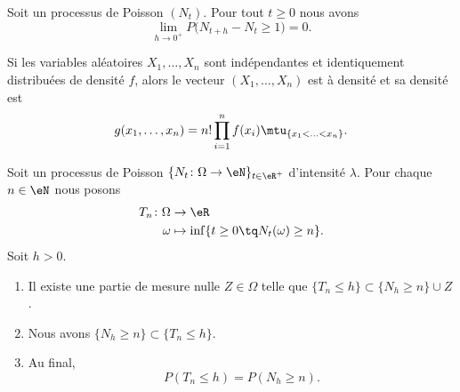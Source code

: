 \begin{proposition}   \label{PROPooGMBBooCIkVCB}
	Soit un processus de Poisson \( (N_t)\). Pour tout \( t\geq 0\) nous avons
	\begin{equation}
		\lim_{h\to 0^+} P\big( N_{t+h}-N_t\geq 1 \big)=0.
	\end{equation}
\end{proposition}

\begin{lemma}     \label{LEMooLNIZooDWUvRN}
	Si les variables aléatoires \( X_1,\ldots, X_n\) sont indépendantes et identiquement distribuées de densité \( f\), alors le vecteur \( (X_1,\ldots, X_n)\) est à densité et sa densité est
	\begin{equation}
		g(x_1,\ldots, x_n)=n!\prod_{i=1}^nf(x_i)\mtu_{\{ x_1<\ldots<x_n \}}.
	\end{equation}
\end{lemma}

\begin{lemma}        \label{LEMooXTVNooSBnnAd}
	Soit un processus de Poisson \(  \{ N_t\colon \Omega\to \eN \}_{t\in \eR^+}  \) d'intensité \( \lambda\). Pour chaque \( n\in \eN\) nous posons
	\begin{equation}
		\begin{aligned}
			T_n\colon \Omega & \to \eR                                         \\
			\omega           & \mapsto \inf\{ t\geq 0\tq N_t(\omega)\geq n \}.
		\end{aligned}
	\end{equation}
	Soit \( h>0\).
	\begin{enumerate}
		\item   \label{ITEMooXVSQooSQmIUv}
		      Il existe une partie de mesure nulle \( Z\in \Omega\) telle que \( \{ T_n\leq h \}\subset \{ N_h\geq n \}\cup Z\).
		\item       \label{ITEMooIPKCooIfjUzS}
		      Nous avons \( \{ N_h\geq n \}\subset \{ T_n\leq h \}\).
		\item
		      Au final,
		      \begin{equation}
			      P(T_n\leq h)=P(N_h\geq n).
		      \end{equation}
	\end{enumerate}
\end{lemma}

